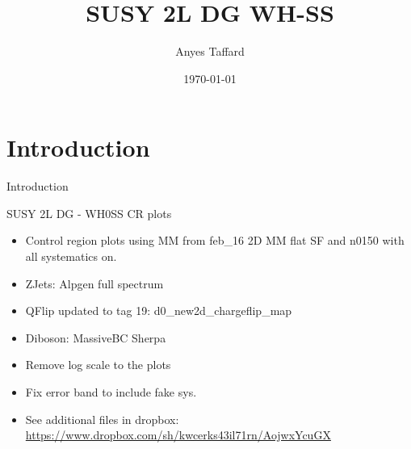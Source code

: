 \documentclass[10pt]{beamer}
\begin{document}

\newcommand{\METrel}{\ensuremath{E_\mathrm{T}^\mathrm{miss,rel}}}
\newcommand{\meff}{\ensuremath{m_{\mathrm{eff}}}}
\newcommand{\mt}{\ensuremath{m_\mathrm{T}}}
\newcommand{\pTmiss}{\ensuremath{\mathbf{p}_\mathrm{T}^\mathrm{miss}}}
\newcommand{\mll}{\ensuremath{m_{\ell\ell}}}
\newcommand{\pTll}{\ensuremath{p_\mathrm{T,\ell\ell}}}
\newcommand{\dphill}{\ensuremath{\Delta\phi_{\ell\ell}}}
\newcommand{\dRll}{\ensuremath{\Delta R_{\ell\ell}}}
\newcommand{\mjj}{\ensuremath{m_{jj}}}
\newcommand{\mljj}{\ensuremath{m_{ljj}}}


\author{Anyes Taffard}
\date{\today}

\title[SUSY 2L WH SS ]{SUSY 2L DG WH-SS}

\begin{frame}[plain]
  \titlepage
\end{frame}

\section{Introduction}
\begin{frame}{Introduction}
  \begin{block}{SUSY 2L DG - WH0SS CR plots }
    \begin{itemize}
    \item Control region plots using MM from feb\_16 2D MM flat SF and n0150 with all systematics on.
    \item ZJets: Alpgen full spectrum
    \item QFlip updated to tag 19: d0\_new2d\_chargeflip\_map
    \item Diboson: MassiveBC Sherpa
    \item Remove log scale to the plots
    \item Fix error band to include fake sys. 
    \item See additional files in dropbox: {\url {https://www.dropbox.com/sh/kwcerks43il71rn/AojwxYcuGX}}
    \end{itemize}
  \end{block}
\end{frame}
\end{document}
